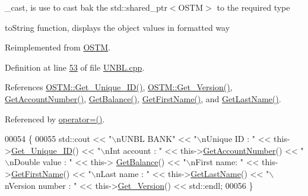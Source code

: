 \+\_\+cast, is use to cast bak the std\+::shared\+\_\+ptr$<$\+O\+S\+T\+M$>$ to the required type 

to\+String function, displays the object values in formatted way 

Reimplemented from \hyperlink{class_o_s_t_m_a513396a115f2987fd07c203309ae8a59_a513396a115f2987fd07c203309ae8a59}{O\+S\+TM}.



Definition at line \hyperlink{_u_n_b_l_8cpp_source_l00053}{53} of file \hyperlink{_u_n_b_l_8cpp_source}{U\+N\+B\+L.\+cpp}.



References \hyperlink{_o_s_t_m_8cpp_source_l00073}{O\+S\+T\+M\+::\+Get\+\_\+\+Unique\+\_\+\+I\+D()}, \hyperlink{_o_s_t_m_8cpp_source_l00089}{O\+S\+T\+M\+::\+Get\+\_\+\+Version()}, \hyperlink{_u_n_b_l_8cpp_source_l00078}{Get\+Account\+Number()}, \hyperlink{_u_n_b_l_8cpp_source_l00070}{Get\+Balance()}, \hyperlink{_u_n_b_l_8cpp_source_l00094}{Get\+First\+Name()}, and \hyperlink{_u_n_b_l_8cpp_source_l00086}{Get\+Last\+Name()}.



Referenced by \hyperlink{_u_n_b_l_8h_source_l00062}{operator=()}.


\begin{DoxyCode}
00054 \{
00055    std::cout << \textcolor{stringliteral}{"\(\backslash\)nUNBL BANK"} << \textcolor{stringliteral}{"\(\backslash\)nUnique ID : "} << this->\hyperlink{class_o_s_t_m_a5a01a8b98d16b1d1904ecf9356e7b71d_a5a01a8b98d16b1d1904ecf9356e7b71d}{Get\_Unique\_ID}() << \textcolor{stringliteral}{"\(\backslash\)nInt account :
       "} << this->\hyperlink{class_u_n_b_l_a44a84fb7fe8778e3048921581049c715_a44a84fb7fe8778e3048921581049c715}{GetAccountNumber}() << \textcolor{stringliteral}{"\(\backslash\)nDouble value : "} << this->
      \hyperlink{class_u_n_b_l_ad5b882bff8d1e2619b2ebbd170345c99_ad5b882bff8d1e2619b2ebbd170345c99}{GetBalance}() << \textcolor{stringliteral}{"\(\backslash\)nFirst name: "} << this->\hyperlink{class_u_n_b_l_ae89215b95f2e11aa70f9c8bbfd55c10c_ae89215b95f2e11aa70f9c8bbfd55c10c}{GetFirstName}() << \textcolor{stringliteral}{"\(\backslash\)nLast name : "} << 
      this->\hyperlink{class_u_n_b_l_a27f19f2af5e1abd33b5c63f16b493f6c_a27f19f2af5e1abd33b5c63f16b493f6c}{GetLastName}()  << \textcolor{stringliteral}{"\(\backslash\)nVersion number : "} << this->\hyperlink{class_o_s_t_m_a1f1db9d482f22c8e7caa17dfb340626b_a1f1db9d482f22c8e7caa17dfb340626b}{Get\_Version}() << std::endl;
00056 \}
\end{DoxyCode}


